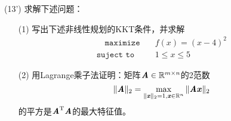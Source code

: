 \documentclass[12pt,a4paper,openany,twoside]{ctexbook}
\begin{document}
\begin{exercise}(13')
	求解下述问题：
	\begin{itemize}
		\item[(1)] 写出下述非线性规划的KKT条件，并求解
		\begin{align*}
			\quad \texttt{maximize} \quad & f(x)=(x-4)^2 \\
			\texttt{suject to} \quad & 1\leq x \leq 5 
		\end{align*}
		\item [(2)] 用Lagrange乘子法证明：矩阵$ \boldsymbol{\mathit{A}}\in\mathbb{R}^{m\times n} $的2范数 \[ \Vert\boldsymbol{\mathit{A}}\Vert_{2}=\max_{\Vert\boldsymbol{\mathit{x}}\Vert_2=1,\boldsymbol{\mathit{x}}\in\mathbb{R}^n}\Vert\boldsymbol{\mathit{A}}\boldsymbol{\mathit{x}}\Vert_{2} \] 的平方是$ \boldsymbol{\mathit{A}}^{\mathrm{T}}\boldsymbol{\mathit{A}} $的最大特征值。
	\end{itemize}
\end{exercise}
\end{document}
